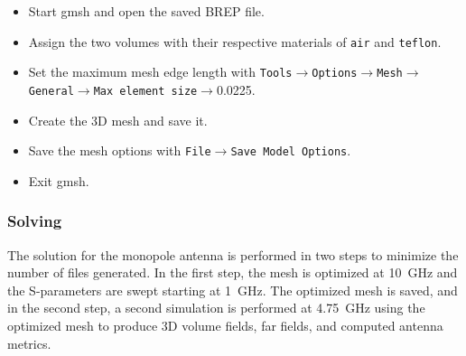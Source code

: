 \documentclass[titlepage]{article}
\renewcommand\_{\textunderscore\linebreak[1]}
\begin{document}
\begin{itemize}
\item Start gmsh and open the saved BREP file.
\item Assign the two volumes with their respective materials of \texttt{air} and \texttt{teflon}.
\item Set the maximum mesh edge length with \newline\texttt{Tools}$\rightarrow$\texttt{Options}$\rightarrow$\texttt{Mesh}$\rightarrow$\texttt{General}$\rightarrow$\texttt{Max element size}$\rightarrow$0.0225.
\item Create the 3D mesh and save it.
\item Save the mesh options with \texttt{File}$\rightarrow$\texttt{Save Model Options}.
\item Exit gmsh.
\end{itemize}

\subsubsection{Solving}

The solution for the monopole antenna is performed in two steps to minimize the number of files generated.  In the first step, the mesh is optimized at 10~GHz and the S-parameters are swept starting at 1~GHz.  The optimized mesh is saved, and in the second step, a second simulation is performed at 4.75~GHz using the optimized mesh to produce 3D volume fields, far fields, and computed antenna metrics.
\end{document}
